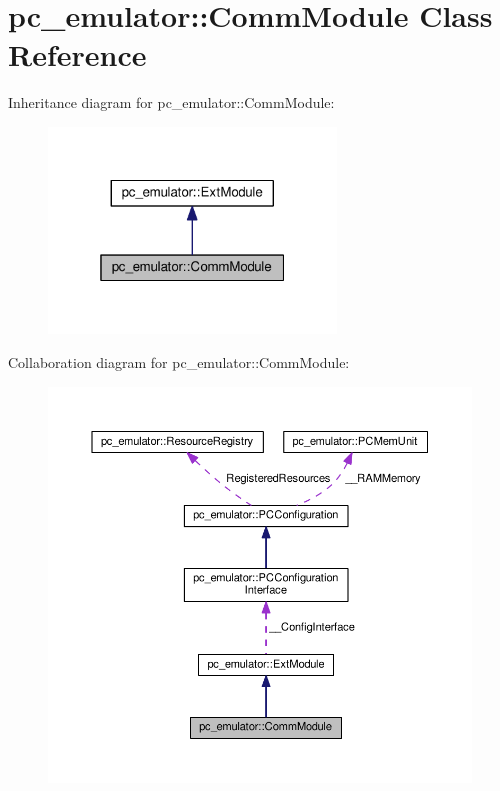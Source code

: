 \hypertarget{classpc__emulator_1_1CommModule}{}\section{pc\+\_\+emulator\+:\+:Comm\+Module Class Reference}
\label{classpc__emulator_1_1CommModule}


Inheritance diagram for pc\+\_\+emulator\+:\+:Comm\+Module\+:\nopagebreak
\begin{figure}[H]
\begin{center}
\leavevmode
\includegraphics[width=217pt]{classpc__emulator_1_1CommModule__inherit__graph}
\end{center}
\end{figure}


Collaboration diagram for pc\+\_\+emulator\+:\+:Comm\+Module\+:\nopagebreak
\begin{figure}[H]
\begin{center}
\leavevmode
\includegraphics[width=350pt]{classpc__emulator_1_1CommModule__coll__graph}
\end{center}
\end{figure}
